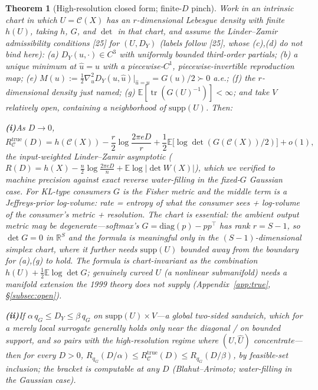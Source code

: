 \documentclass[lettersize,onecolumn]{IEEEtran}
\newtheorem{theorem}{Theorem}
\theoremstyle{definition}
\theoremstyle{remark}
\newcommand{\tr}{\operatorname{tr}}
\newcommand{\E}{\mathbb{E}}
\begin{document}
\begin{theorem}[High-resolution closed form; finite-$D$ pinch]\label{thm:B3}
Work in an intrinsic chart in which $U=\mathcal{C}(X)$ has an $r$-dimensional Lebesgue
density with finite $h(U)$, taking $h$, $G$, and $\det$ in that chart, and assume the
Linder--Zamir admissibility conditions [25] for $(U,D_Y)$ (labels follow [25], whose (c),(d) do not bind here): \emph{(a)}
$D_Y(u,\cdot)\in C^3$ with uniformly bounded third-order partials; \emph{(b)} a unique
minimum at $\hat u=u$ with a piecewise-$C^1$, piecewise-invertible reproduction map;
\emph{(e)} $M(u):=\tfrac12\nabla^2_{\hat u}D_Y(u,\hat u)|_{\hat u=u}=G(u)/2\succ0$ a.e.;
\emph{(f)} the $r$-dimensional density just named; \emph{(g)}
$\E[\tr(G(U)^{-1})]<\infty$; and take $V$ relatively open, containing a neighborhood of
$\mathrm{supp}(U)$. Then:

\smallskip\noindent\textbf{(i)}\;As $D\to0$,
\[
R_{\mathcal{C}}^{\mathrm{true}}(D)=h(\mathcal{C}(X))-\frac r2\log\frac{2\pi eD}{r}
+\frac12\E\bigl[\log\det(G(\mathcal{C}(X))/2)\bigr]+o(1),
\]
the input-weighted Linder--Zamir asymptotic ($R(D)=h(X)-\tfrac n2\log\tfrac{2\pi
eD}{n}+\E\log|\det W(X)|$), which we verified to machine precision against exact reverse
water-filling in the fixed-$G$ Gaussian case. For KL-type consumers $G$ is the Fisher
metric and the middle term is a Jeffreys-prior log-volume: \emph{rate = entropy of
what the consumer sees + log-volume of the consumer's metric + resolution}. The
chart is essential: the ambient output metric may be degenerate---softmax's
$G=\mathrm{diag}(p)-pp^\top$ has rank $r=S-1$, so $\det G=0$ in $\mathbb{R}^S$ and the
formula is meaningful only in the $(S-1)$-dimensional simplex chart, where it further
needs $\mathrm{supp}(U)$ bounded away from the boundary for (a),(g) to hold. The formula
is chart-invariant as the combination $h(U)+\tfrac12\E\log\det G$; genuinely
\emph{curved} $U$ (a nonlinear submanifold) needs a manifold extension the 1999 theory
does not supply (Appendix~\ref{app:true}, \S\ref{subsec:open}).

\smallskip\noindent\textbf{(ii)}\;If $\alpha\,q_G\le D_Y\le\beta\,q_G$ on
$\mathrm{supp}(U)\times V$---a \emph{global} two-sided sandwich, which for a merely
local surrogate generally holds only near the diagonal / on bounded support, and so
pairs with the high-resolution regime where $(U,\hat U)$ concentrate---then for every
$D>0$, $R_{q_G}(D/\alpha)\le R_{\mathcal{C}}^{\mathrm{true}}(D)\le R_{q_G}(D/\beta)$, by
feasible-set inclusion; the bracket is computable at any $D$ (Blahut--Arimoto;
water-filling in the Gaussian case).
\end{theorem}
\end{document}
